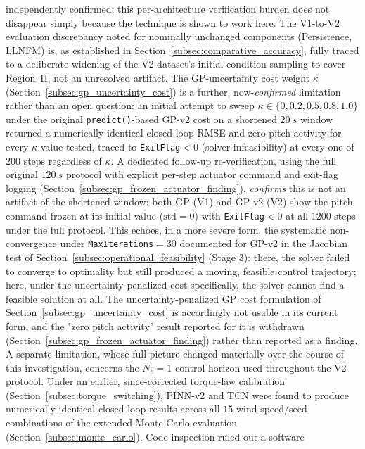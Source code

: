 independently confirmed; this per-architecture verification burden does
not disappear simply because the technique is shown to work here.
The V1-to-V2 evaluation discrepancy noted for nominally unchanged
components (Persistence, LLNFM) is, as established in
Section~\ref{subsec:comparative_accuracy}, fully traced to a
deliberate widening of the V2 dataset's initial-condition sampling to
cover Region~II, not an unresolved artifact. The GP-uncertainty cost
weight $\kappa$ (Section~\ref{subsec:gp_uncertainty_cost}) is a further,
now-\emph{confirmed} limitation rather than an open question: an initial
attempt
to sweep $\kappa \in \{0, 0.2, 0.5, 0.8, 1.0\}$ under the original
\texttt{predict()}-based GP-v2 cost on a shortened $\SI{20}{s}$ window
returned a numerically identical closed-loop RMSE and zero pitch
activity for every $\kappa$ value tested, traced to
\texttt{ExitFlag}$<0$ (solver infeasibility) at every one of $200$
steps regardless of $\kappa$. A dedicated follow-up re-verification,
using the full original $\SI{120}{s}$ protocol with explicit per-step
actuator command and exit-flag logging (Section~\ref{subsec:gp_frozen_actuator_finding}),
\emph{confirms} this is not an artifact of the shortened window: both
GP (V1) and GP-v2 (V2) show the pitch command frozen at its initial
value ($\text{std}=0$) with \texttt{ExitFlag}$<0$ at all $1200$ steps
under the full protocol. This echoes, in a more severe form, the
systematic
non-convergence under \texttt{MaxIterations}$=30$ documented for
GP-v2 in the Jacobian test of Section~\ref{subsec:operational_feasibility}
(Stage 3): there, the solver failed to converge to optimality but still
produced a moving, feasible control trajectory; here, under the
uncertainty-penalized cost specifically, the solver cannot find a
feasible solution at all. The uncertainty-penalized GP cost formulation
of Section~\ref{subsec:gp_uncertainty_cost} is accordingly not usable
in its current form, and the "zero pitch activity" result reported for
it is withdrawn (Section~\ref{subsec:gp_frozen_actuator_finding}) rather
than reported as a finding. A separate limitation, whose full picture changed materially over the
course of this investigation, concerns the $N_c=1$ control horizon used
throughout the V2 protocol. Under an earlier, since-corrected torque-law
calibration (Section~\ref{subsec:torque_switching}), PINN-v2 and TCN were
found to produce numerically identical closed-loop results across all
$15$ wind-speed/seed combinations of the extended Monte Carlo evaluation
(Section~\ref{subsec:monte_carlo}). Code inspection ruled out a software
